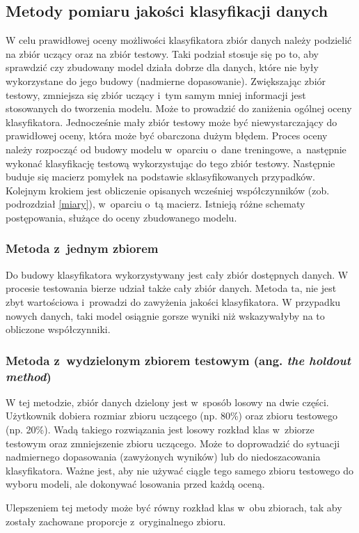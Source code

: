 \subsection{Metody pomiaru jakości klasyfikacji danych} \label {testowanieklasyfikatora}
W celu prawidłowej oceny możliwości klasyfikatora zbiór danych należy podzielić na zbiór uczący oraz na zbiór testowy. Taki podział stosuje się po to, aby sprawdzić czy zbudowany model działa dobrze dla danych, które nie były wykorzystane do jego budowy (nadmierne dopasowanie). Zwiększając zbiór testowy, zmniejsza się zbiór uczący i~tym samym mniej informacji jest stosowanych do tworzenia modelu. Może to prowadzić do zaniżenia ogólnej oceny klasyfikatora. Jednocześnie mały zbiór testowy może być niewystarczający do prawidłowej oceny, która może być obarczona dużym błędem. Proces oceny należy rozpocząć od budowy modelu w~oparciu o~dane treningowe, a~następnie wykonać klasyfikację testową wykorzystując do tego zbiór testowy. Następnie buduje się macierz pomyłek na podstawie sklasyfikowanych przypadków. Kolejnym krokiem jest obliczenie opisanych wcześniej współczynników (zob. podrozdział \ref*{miary}), w~oparciu o~tą macierz. Istnieją różne schematy postępowania, służące do oceny zbudowanego modelu.

\subsubsection{Metoda z~jednym zbiorem}
Do budowy klasyfikatora wykorzystywany jest cały zbiór dostępnych danych. W procesie testowania bierze udział także cały zbiór danych. Metoda ta, nie jest zbyt wartościowa i~prowadzi do zawyżenia jakości klasyfikatora. W przypadku nowych danych, taki model osiągnie gorsze wyniki niż wskazywałyby na to obliczone współczynniki.

\subsubsection{Metoda z~wydzielonym zbiorem testowym (ang. \textit{the holdout method})}
W tej metodzie, zbiór danych dzielony jest w~sposób losowy na dwie części. Użytkownik dobiera rozmiar zbioru uczącego (np. 80\%) oraz zbioru testowego (np. 20\%). Wadą takiego rozwiązania jest losowy rozkład klas w~zbiorze testowym oraz zmniejszenie zbioru uczącego. Może to doprowadzić do sytuacji nadmiernego dopasowania (zawyżonych wyników) lub do niedoszacowania klasyfikatora. Ważne jest, aby nie używać ciągle tego samego zbioru testowego do wyboru modeli, ale dokonywać losowania przed każdą oceną.\par
Ulepszeniem tej metody może być równy rozkład klas w~obu zbiorach, tak aby zostały zachowane proporcje z~oryginalnego zbioru.

